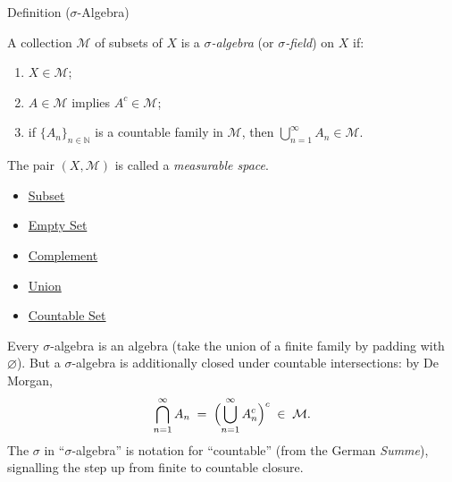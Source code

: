 
\begin{definitionbox}{Definition ($\sigma$-Algebra)}
\begin{definition}\label{def:sigma-algebra}
A collection $\mathcal{M}$ of subsets of $X$ is a \emph{$\sigma$-algebra}
(or \emph{$\sigma$-field}) on $X$ if:
\begin{enumerate}[label=(\roman*)]
\item $X \in \mathcal{M}$;
\item $A \in \mathcal{M}$ implies $A^c \in \mathcal{M}$;
\item if $\{A_n\}_{n \in \mathbb{N}}$ is a countable family in $\mathcal{M}$,
  then $\bigcup_{n=1}^{\infty} A_n \in \mathcal{M}$.
\end{enumerate}
The pair $(X, \mathcal{M})$ is called a \emph{measurable space}.
\end{definition}
\end{definitionbox}

\begin{dependencies}
\begin{itemize}
  \item \hyperref[def:subset]{Subset}
  \item \hyperref[def:empty-set]{Empty Set}
  \item \hyperref[def:complement]{Complement}
  \item \hyperref[def:union]{Union}
  \item \hyperref[def:countable]{Countable Set}
\end{itemize}
\end{dependencies}

\begin{remark*}
Every $\sigma$-algebra is an algebra (take the union of a finite family by
padding with $\varnothing$). But a $\sigma$-algebra is additionally closed
under countable intersections: by De Morgan,
\[
\bigcap_{n=1}^{\infty} A_n
\;=\;
\Bigl(\bigcup_{n=1}^{\infty} A_n^c\Bigr)^c
\;\in\; \mathcal{M}.
\]
The $\sigma$ in ``$\sigma$-algebra'' is notation for ``countable'' (from the
German \emph{Summe}), signalling the step up from finite to countable closure.
\end{remark*}

